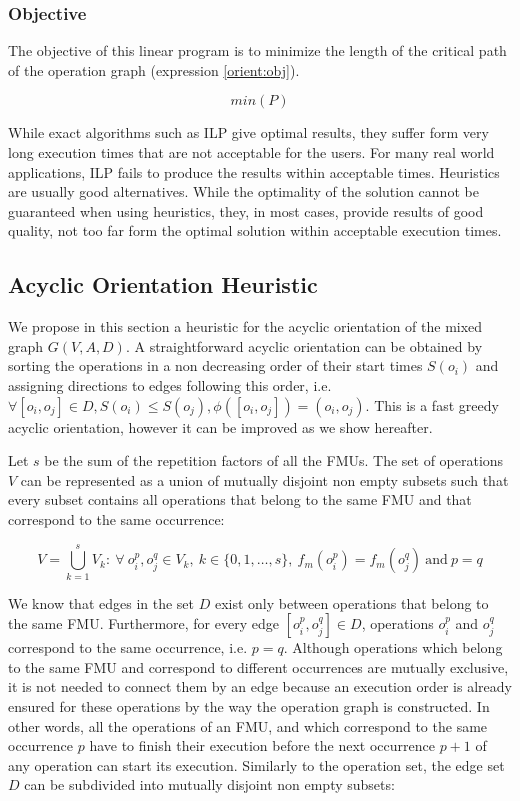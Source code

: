 \subsubsection{Objective}

The objective of this linear program is to minimize the length of the critical path of the operation graph (expression \ref{orient:obj}).

\begin{equation}
min(P)
\label{orient:obj}
\end{equation}

While exact algorithms such as ILP give optimal results, they suffer form very long execution times that are not acceptable for the users. For many real world applications, ILP fails to produce the results within acceptable times. Heuristics are usually good alternatives. While the optimality of the solution cannot be guaranteed when using heuristics, they, in most cases, provide results of good quality, not too far form the optimal solution within acceptable execution times.

\subsection{Acyclic Orientation Heuristic}

We propose in this section a heuristic for the acyclic orientation of the mixed graph $G(V,A,D)$. A straightforward acyclic orientation can be obtained by sorting the operations in a non decreasing order of their start times $S(o_i)$ and assigning directions to edges following this order, i.e. $\forall [o_i,o_j] \in D, S(o_i) \leq S(o_j), \phi([o_i,o_j]) = (o_i,o_j)$. This is a fast greedy acyclic orientation, however it can be improved as we show hereafter.

Let $s$ be the sum of the repetition factors of all the FMUs. The set of operations $V$ can be represented as a union of mutually disjoint non empty subsets such that every subset contains all operations that belong to the same FMU and that correspond to the same occurrence:

\begin{equation}
V = \bigcup_{k=1}^s V_k:\ \forall\ o_i^p, o_j^q \in V_k,\ k \in \{0, 1, \ldots, s\},\ f_m(o_i^p)=f_m(o_j^q)\ \text{and}\ p = q
\label{eq:opsubset}
\end{equation}

We know that edges in the set $D$ exist only between operations that belong to the same FMU. Furthermore, for every edge $[o_i^p,o_j^q] \in D$, operations $o_i^p$ and $o_j^q$ correspond to the same occurrence, i.e. $p = q$. Although operations which belong to the same FMU and correspond to different occurrences are mutually exclusive, it is not needed to connect them by an edge because an execution order is already ensured for these operations by the way the operation graph is constructed. In other words, all the operations of an FMU, and which correspond to the same occurrence $p$ have to finish their execution before the next occurrence $p+1$ of any operation can start its execution. Similarly to the operation set, the edge set $D$ can be subdivided into mutually disjoint non empty subsets:

